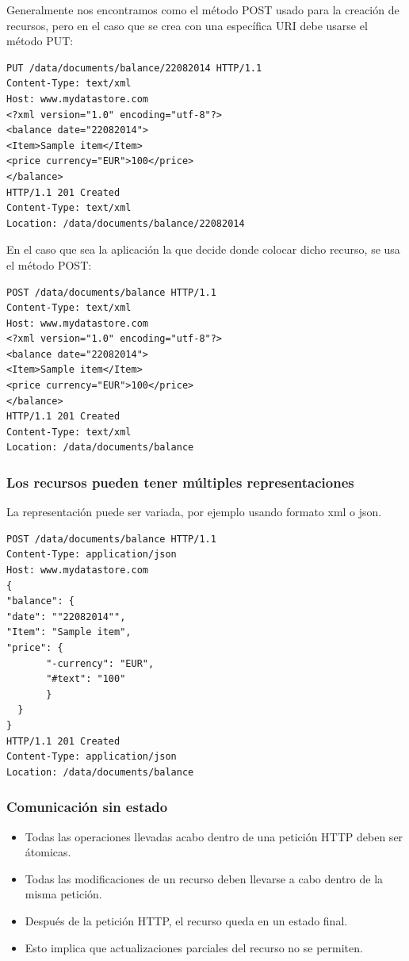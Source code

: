 \documentclass[4paper]{article}
\begin{document}
\newpage
Generalmente nos encontramos como el método POST usado para la creación de recursos, pero en el caso que se crea con una específica URI debe usarse el método PUT:
\begin{verbatim}
PUT /data/documents/balance/22082014 HTTP/1.1
Content-Type: text/xml
Host: www.mydatastore.com
<?xml version="1.0" encoding="utf-8"?>
<balance date="22082014">
<Item>Sample item</Item>
<price currency="EUR">100</price>
</balance>
HTTP/1.1 201 Created
Content-Type: text/xml
Location: /data/documents/balance/22082014
\end{verbatim}
En el caso que sea la aplicación la que decide donde colocar dicho recurso, se usa el método POST:
\begin{verbatim}
POST /data/documents/balance HTTP/1.1
Content-Type: text/xml
Host: www.mydatastore.com
<?xml version="1.0" encoding="utf-8"?>
<balance date="22082014">
<Item>Sample item</Item>
<price currency="EUR">100</price>
</balance>
HTTP/1.1 201 Created
Content-Type: text/xml
Location: /data/documents/balance
\end{verbatim}

\newpage

\subsubsection{Los recursos pueden tener múltiples representaciones}
La representación puede ser variada, por ejemplo usando formato xml o json.
\begin{verbatim}
POST /data/documents/balance HTTP/1.1
Content-Type: application/json
Host: www.mydatastore.com
{
"balance": {
"date": ""22082014"",
"Item": "Sample item",
"price": {
       "-currency": "EUR",
       "#text": "100"
       }
  }
}
HTTP/1.1 201 Created
Content-Type: application/json
Location: /data/documents/balance
\end{verbatim}


\subsubsection{Comunicación sin estado}
\begin{itemize}
\item Todas las operaciones llevadas acabo dentro de una petición HTTP deben ser átomicas.
\item Todas las modificaciones de un recurso deben llevarse a cabo dentro de la misma petición.
\item Después de la petición HTTP, el recurso queda en un estado final.
\item Esto implica que actualizaciones parciales del recurso no se permiten.
\end{itemize}
\end{document}

